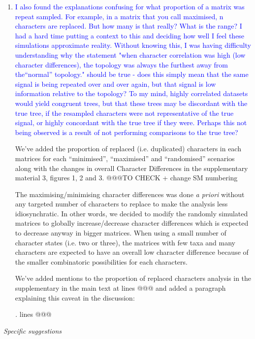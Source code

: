 \documentclass[12pt,letterpaper]{article}
\renewcommand{\subsection}[1]{%
\bigskip
\begin{center}
\begin{large}
\normalfont\itshape #1
\end{large}
\end{center}}
\begin{document}
\begin{enumerate}
\item{\textcolor{blue}{I also found the explanations confusing for what proportion of a matrix was repeat sampled. For example, in a matrix that you call maximised, n characters are replaced. But how many is that really? What is the range? I had a hard time putting a context to this and deciding how well I feel these simulations approximate reality. Without knowing this, I was having difficulty understanding why the statement "when character correlation was high (low character differences), the topology was always the furthest away from the``normal'' topology." 
should be true - does this simply mean that the same signal is being repeated over and over again, but that signal is low information relative to the topology? To my mind, highly correlated datasets would yield congruent trees, but that these trees may be discordant with the true tree, if the resampled characters were not representative of the true signal, or highly concordant with the true tree if they were. Perhaps this not being observed is a result of not performing comparisons to the true tree?}}

We've added the proportion of replaced (i.e. duplicated) characters in each matrices for each ``minimised'', ``maximised'' and ``randomised'' scenarios along with the changes in overall Character Differences in the supplementary material 3, figures 1, 2 and 3.
 @@@TO CHECK + change SM numbering

The maximising/minimising character differences was done \textit{a priori} without any targeted number of characters to replace to make the analysis less idiosynchratic.
In other words, we decided to modify the randomly simulated matrices to globally increase/decrease character differences which is expected to decrease anyway in bigger matrices.
When using a small number of character states (i.e. two or three), the matrices with few taxa and many characters are expected to have an overall low character difference because of the smaller combinatoric possibilities for each characters.

We've added mentions to the proportion of replaced characters analysis in the supplementary in the main text at lines @@@ and added a paragraph explaining this caveat in the discussion:

\textit{.} lines @@@


\end{enumerate}

\subsection{Specific suggestions}
\end{document}
